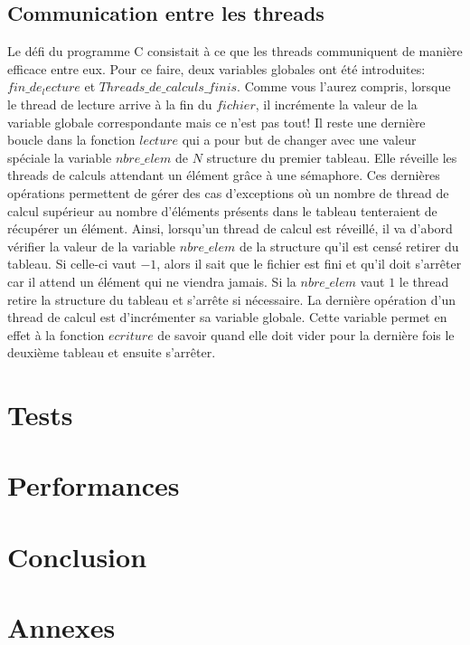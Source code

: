 \documentclass{article}
\begin{document}
\subsection{Communication entre les threads} \label{Com}
Le défi du programme C consistait à ce que les threads communiquent de manière efficace entre eux. Pour ce faire, deux variables globales ont été introduites: $fin\_de_lecture$ et $Threads\_de\_calculs\_finis$. Comme vous l'aurez compris, lorsque le thread de lecture arrive à la fin du $fichier$, il incrémente la valeur de la variable globale correspondante mais ce n'est pas tout! Il reste une dernière boucle dans la fonction $lecture$ qui a pour but de changer avec une valeur spéciale la variable $nbre\_elem$ de $N$ structure du premier tableau. Elle réveille les threads de calculs attendant un élément grâce à une sémaphore.  Ces dernières opérations permettent de gérer des cas d'exceptions où un nombre de thread de calcul supérieur au nombre d'éléments présents dans le tableau tenteraient de récupérer un élément. Ainsi, lorsqu'un thread de calcul est réveillé, il va d'abord vérifier la valeur de la variable $nbre\_elem$ de la structure qu'il est censé retirer du tableau. Si celle-ci vaut $-1$, alors il sait que le fichier est fini et qu'il doit s'arrêter car il attend un élément qui ne viendra jamais. Si la $nbre\_elem$ vaut $1$ le thread retire la structure du tableau et s'arrête si nécessaire. La dernière opération d'un thread de calcul est d'incrémenter sa variable globale. Cette variable permet en effet à la fonction $ecriture$ de savoir quand elle doit vider pour la dernière fois le deuxième tableau et ensuite s'arrêter.

\section{Tests}
\section{Performances}
\section{Conclusion}
\section{Annexes}


\end{document}
